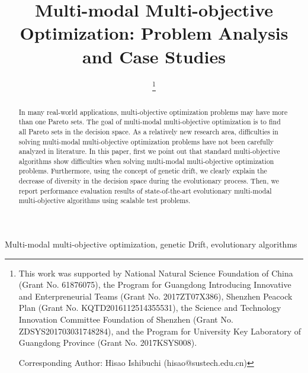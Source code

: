 \documentclass[conference]{IEEEtran}
\begin{document}
\title{Multi-modal Multi-objective Optimization: Problem Analysis and Case Studies
}
\author{
\thanks{This work was supported by National Natural Science Foundation of China (Grant No. 61876075), the Program for Guangdong Introducing Innovative and Enterpreneurial Teams (Grant No. 2017ZT07X386), Shenzhen Peacock Plan (Grant No. KQTD2016112514355531), the Science and Technology Innovation Committee Foundation of Shenzhen (Grant No. ZDSYS201703031748284), and the Program for University Key Laboratory of Guangdong Province (Grant No. 2017KSYS008).

Corresponding Author: Hisao Ishibuchi (hisao@sustech.edu.cn)
}
}

\maketitle

\begin{abstract}
In many real-world applications, multi-objective optimization problems may have more than one Pareto sets. The goal of multi-modal multi-objective optimization is to find all Pareto sets in the decision space. As a relatively new research area, difficulties in solving multi-modal multi-objective optimization problems have not been carefully analyzed in literature. In this paper, first we point out that standard multi-objective algorithms show difficulties when solving multi-modal multi-objective optimization problems. Furthermore, using the concept of genetic drift, we clearly explain the decrease of diversity in the decision space during the evolutionary process. Then, we report performance evaluation results of state-of-the-art evolutionary multi-modal multi-objective algorithms using scalable test problems.
\end{abstract}

\begin{IEEEkeywords}
Multi-modal multi-objective optimization, genetic Drift, evolutionary algorithms
\end{IEEEkeywords}
\end{document}
